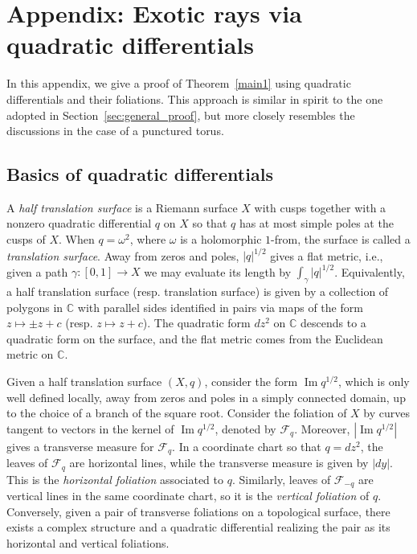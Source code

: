 \documentclass[11pt]{article} %
\theoremstyle{plain}
\theoremstyle{definition}
\DeclareMathOperator{\impart}{Im}
\numberwithin{equation}{section}
\begin{document}
\appendix
\section{Appendix: Exotic rays via quadratic differentials}\label{sec:translation}
In this appendix, we give a proof of Theorem~\ref{main1} using quadratic differentials and their foliations. This approach is similar in spirit to the one adopted in Section~\ref{sec:general_proof}, but more closely resembles the discussions in the case of a punctured torus.
\subsection{Basics of quadratic differentials}
A \emph{half translation surface} is a Riemann surface $X$ with cusps together with a nonzero quadratic differential $q$ on $X$ so that $q$ has at most simple poles at the cusps of $X$. When $q=\omega^2$, where $\omega$ is a holomorphic $1$-from, the surface is called a \emph{translation surface}. Away from zeros and poles, $|q|^{1/2}$ gives a flat metric, i.e., given a path $\gamma:[0,1]\to X$ we may evaluate its length by $\int_\gamma|q|^{1/2}$. Equivalently, a half translation surface (resp. translation surface) is given by a collection of polygons in $\mathbb{C}$ with parallel sides identified in pairs via maps of the form $z\mapsto\pm z+c$ (resp. $z\mapsto z+c$). The quadratic form $dz^2$ on $\mathbb{C}$ descends to a quadratic form on the surface, and the flat metric comes from the Euclidean metric on $\mathbb{C}$. 

Given a half translation surface $(X,q)$, consider the form $\impart q^{1/2}$, which is only well defined locally, away from zeros and poles in a simply connected domain, up to the choice of a branch of the square root. Consider the foliation of $X$ by curves tangent to vectors in the kernel of $\impart q^{1/2}$, denoted by $\mathcal{F}_q$. Moreover, $|\impart q^{1/2}|$ gives a transverse measure for $\mathcal{F}_q$. In a coordinate chart so that $q=dz^2$, the leaves of $\mathcal{F}_q$ are horizontal lines, while the transverse measure is given by $|dy|$. This is the \emph{horizontal foliation} associated to $q$. Similarly, leaves of $\mathcal{F}_{-q}$ are vertical lines in the same coordinate chart, so it is the \emph{vertical foliation} of $q$. Conversely, given a pair of transverse foliations on a topological surface, there exists a complex structure and a quadratic differential realizing the pair as its horizontal and vertical foliations.
\end{document}
